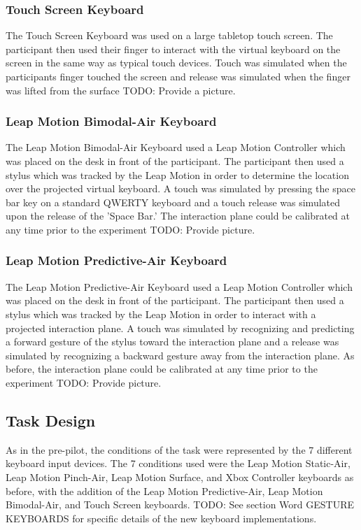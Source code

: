 \subsubsection{Touch Screen Keyboard}
The Touch Screen Keyboard was used on a large tabletop touch screen. The participant then used their finger to interact with the virtual keyboard on the screen in the same way as typical touch devices. Touch was simulated when the participants finger touched the screen and release was simulated when the finger was lifted from the surface TODO: Provide a picture.

\subsubsection{Leap Motion Bimodal-Air Keyboard}
The Leap Motion Bimodal-Air Keyboard used a Leap Motion Controller which was placed on the desk in front of the participant. The participant then used a stylus which was tracked by the Leap Motion in order to determine the location over the projected virtual keyboard. A touch was simulated by pressing the space bar key on a standard QWERTY keyboard and a touch release was simulated upon the release of the 'Space Bar.' The interaction plane could be calibrated at any time prior to the experiment TODO: Provide picture.

\subsubsection{Leap Motion Predictive-Air Keyboard}
The Leap Motion Predictive-Air Keyboard used a Leap Motion Controller which was placed on the desk in front of the participant. The participant then used a stylus which was tracked by the Leap Motion in order to interact with a projected interaction plane. A touch was simulated by recognizing and predicting a forward gesture of the stylus toward the interaction plane and a release was simulated by recognizing a backward gesture away from the interaction plane. As before, the interaction plane could be calibrated at any time prior to the experiment TODO: Provide picture.

\subsection{Task Design} \label{pilot_task_design}
As in the pre-pilot, the conditions of the task were represented by the 7 different keyboard input devices. The 7 conditions used were the Leap Motion Static-Air, Leap Motion Pinch-Air, Leap Motion Surface, and Xbox Controller keyboards as before, with the addition of the Leap Motion Predictive-Air, Leap Motion Bimodal-Air, and Touch Screen keyboards. TODO: See section Word GESTURE KEYBOARDS for specific details of the new keyboard implementations. 


